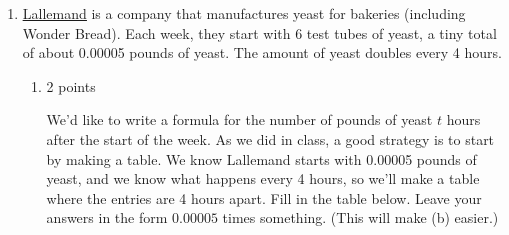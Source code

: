 \documentclass{article}
\makeatletter
\let\@href=\href
\renewcommand{\href}[2]{\@href{#1}{\ul{#2}}}
\makeatother
\begin{document}
\begin{enumerate}
\begin{enumerate}
  \item 

    \begin{grading}
      1.5 points. This is exploratory, so students get full credit for any thoughtful answer. 
    \end{grading}

    \begin{problem}[\nstretch{1.25}]
      (Exploratory) Your friend says, ``If Google's traffic acquisition costs increase by 17\% per year, they should increase by 170\% in the 10 years between 2014 and 2024.'' But your answer to (c) shows this isn't right! Can you explain why your friend's thinking is incorrect? 
    \end{problem}

    \begin{solution}
      Each year, Google's traffic acquisition costs increase by $17\%$
      \textbf{compared to the previous year.} The increase from 2015 to
      2016 is more than a $17\%$ increase \textbf{compared to 2014},
      because the costs in 2015 were more than the costs in 2014.
    \end{solution}

  \end{enumerate}

\item \label{lallemand}

  \href{https://www.lallemand.com/}{Lallemand} is a company that manufactures yeast for bakeries (including Wonder Bread). Each week, they start with 6 test tubes of yeast, a tiny total of about 0.00005 pounds of yeast. The amount of yeast doubles every 4 hours.
  \begin{enumerate}
  \item

    \begin{grading}
      2 points  
    \end{grading}

    \begin{problem}
      We'd like to write a formula for the number of pounds of yeast $t$ hours after the start of the week. As we did in class, a good strategy is to start by making a table. We know Lallemand starts with 0.00005 pounds of yeast, and we know what happens every 4 hours, so we'll make a table where the entries are 4 hours apart. Fill in the table below. Leave your answers in the form $0.00005$ times something. (This will make (b) easier.) 
    \end{problem}


\end{enumerate}
\end{enumerate}
\end{document}
